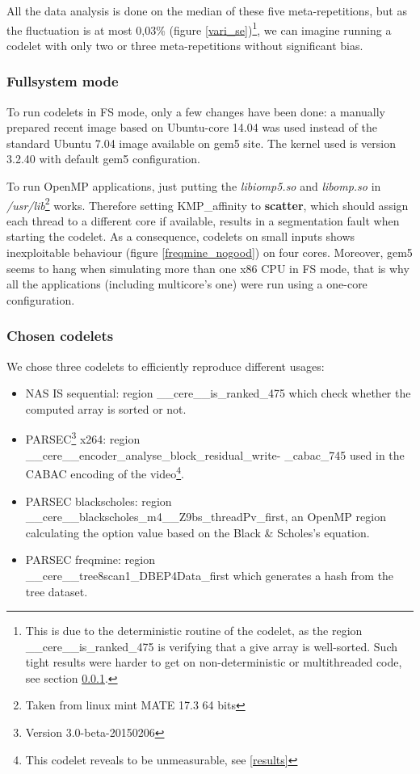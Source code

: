 \documentclass{article}
\begin{document}
\begin{multicols}{2}

All the data analysis is done on the median of these five meta-repetitions, but as the fluctuation is at most 0,03\% (figure \ref{vari_se})\footnote{This is due to the deterministic routine of the codelet, as the region \_\_cere\_\_is\_ranked\_475 is verifying that a give array is well-sorted. Such tight results were harder to get on non-deterministic or multithreaded code, see section \ref{FS_mode}.}, we can imagine running a codelet with only two or three meta-repetitions without significant bias.

\subsubsection{Fullsystem mode}
\label{FS_mode}
To run codelets in FS mode, only a few changes have been done: a manually prepared recent image based on Ubuntu-core 14.04 was used instead of the standard Ubuntu 7.04 image available on gem5 site. The kernel used is version 3.2.40 with default gem5 configuration.


To run OpenMP applications, just putting the \textit{libiomp5.so} and \textit{libomp.so} in \textit{/usr/lib}\footnote{Taken from linux mint MATE 17.3 64 bits} works. Therefore setting KMP\_affinity to \textbf{scatter}, which should assign each thread to a different core if available, results in a segmentation fault when starting the codelet. As a consequence, codelets on small inputs shows inexploitable behaviour (figure \ref{freqmine_nogood}) on four cores.
 Moreover, gem5 seems to hang when simulating more than one x86 CPU in FS mode, that is why all the applications (including multicore's one) were run using a one-core configuration.


\subsubsection{Chosen codelets}
We chose three codelets to efficiently reproduce different usages:
\begin{itemize}
\item NAS IS sequential: region \_\_cere\_\_is\_ranked\_475 which check whether the computed array is sorted or not.
\item PARSEC\footnote{Version 3.0-beta-20150206} x264: region \\ \_\_cere\_\_encoder\_analyse\_block\_residual\_write- \_cabac\_745 used in the CABAC encoding of the video\footnote{This codelet reveals to be unmeasurable, see \ref{results}}.
\item PARSEC blackscholes: region \\ \_\_cere\_\_blackscholes\_m4\_\_Z9bs\_threadPv\_first, an OpenMP region calculating the option value based on the Black \& Scholes's equation.
\item PARSEC freqmine: region\\ \_\_cere\_\_tree8scan1\_DBEP4Data\_first which generates a hash from the tree dataset.
\end{itemize}


\end{multicols}
\end{document}
